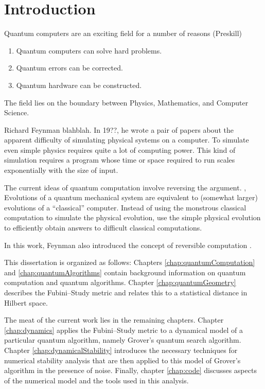 


\chapter{Introduction}
\label{chap:introduction}
%


Quantum computers are an exciting field for a number of reasons
(Preskill)
\begin{enumerate}
\item{Quantum computers can solve hard problems.}
\item{Quantum errors can be corrected.}
\item{Quantum hardware can be constructed.}
\end{enumerate}

The field lies on the boundary between Physics, Mathematics, 
and Computer Science.

Richard Feynman blahblah.
In 19??, he wrote a pair of papers about the apparent 
difficulty of simulating physical systems on a computer.  
To simulate even simple physics requires quite a lot
of computing power.
This kind of simulation requires a program whose time
or space required to run scales exponentially with the
size of input.

The current ideas of quantum computation involve reversing
the argument. \ie, Evolutions of a quantum mechanical 
system are equivalent to (somewhat larger) evolutions of a
``classical'' computer.  Instead of using the monstrous 
classical computation to simulate the physical evolution,
use the simple physical evolution to efficiently obtain 
answers to difficult classical computations.

In this work, Feynman also introduced the concept of reversible 
computation .  



This dissertation is organized as follows:  Chapters \ref{chap:quantumComputation}
and \ref{chap:quantumAlgorithms} contain background information on quantum computation
and quantum algorithms.
Chapter \ref{chap:quantumGeometry} describes the
Fubini--Study metric and relates this to a statistical distance in Hilbert space.

The meat of the current work lies in the remaining chapters.  
Chapter \ref{chap:dynamics} applies the Fubini--Study  metric to a dynamical 
model of a particular quantum algorithm, namely Grover's quantum search algorithm.  
Chapter \ref{chap:dynamicalStability} introduces the
necessary techniques for numerical stability analysis that are then applied to
this model of Grover's algorithm in the presence of noise. 
Finally, chapter \ref{chap:code} discusses aspects of the numerical model and the 
tools used in this analysis. 



